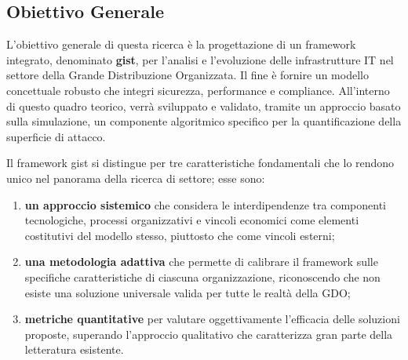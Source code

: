 \subsection{Obiettivo Generale}

\label{ssec:obiettivo_generale}
L'obiettivo generale di questa ricerca è la progettazione di un framework integrato, denominato \textbf{\gls{gist}}, per l'analisi e l'evoluzione delle infrastrutture IT nel settore della Grande Distribuzione Organizzata. Il fine è fornire un modello concettuale robusto che integri sicurezza, performance e compliance. All'interno di questo quadro teorico, verrà sviluppato e validato, tramite un approccio basato sulla simulazione, un componente algoritmico specifico per la quantificazione della superficie di attacco.

Il framework \gls{gist} si distingue per tre caratteristiche fondamentali che lo rendono unico nel panorama della ricerca di settore; esse sono: 
\begin{enumerate}
    \item  \textbf{un approccio sistemico} che considera le interdipendenze tra componenti tecnologiche, processi organizzativi e vincoli economici come elementi costitutivi del modello stesso, piuttosto che come vincoli esterni;
    \item \textbf{una metodologia adattiva} che permette di calibrare il framework sulle specifiche caratteristiche di ciascuna organizzazione, riconoscendo che non esiste una soluzione universale valida per tutte le realtà della GDO; 
    \item \textbf{metriche quantitative} per valutare oggettivamente l'efficacia delle soluzioni proposte, superando l'approccio qualitativo che caratterizza gran parte della letteratura esistente.
\end{enumerate}


